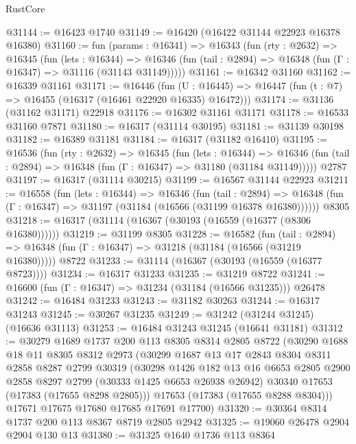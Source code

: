 \begin{lexlean}{RustCore}
\begin{coremodule}
@31144 := @16423 @1740
@31149 := @16420 (@16422 @31144 @22923 @16378 @16380)
@31160 := fun (params : @16341) =>
  @16343
    (fun (rty : @2632) =>
    @16345
      (fun (lets : @16344) =>
      @16346 (fun (tail : @2894) => @16348 (fun (Γ : @16347) => @31116 (@31143 @31149)))))
@31161 := @16342 @31160
@31162 := @16339 @31161
@31171 := @16446
    (fun (U : @16445) => @16447 (fun (t : @7) => @16455 (@16317 (@16461 @22920 @16335) @16472)))
@31174 := @31136 (@31162 @31171) @22918
@31176 := @16302 @31161 @31171
@31178 := @16533 @31160 @7871
@31180 := @16317 (@31114 @30195)
@31181 := @31139 @30198
@31182 := @16389 @31181
@31184 := @16317 (@31182 @16410)
@31195 := @16536
    (fun (rty : @2632) =>
    @16345
      (fun (lets : @16344) =>
      @16346 (fun (tail : @2894) => @16348 (fun (Γ : @16347) => @31180 (@31184 @31149)))))
    @2787
@31197 := @16317 (@31114 @30215)
@31199 := @16567 @31144 @22923
@31211 := @16558
    (fun (lets : @16344) =>
    @16346
      (fun (tail : @2894) =>
      @16348 (fun (Γ : @16347) => @31197 (@31184 (@16566 (@31199 @16378 @16380))))))
    @8305
@31218 := @16317 (@31114 (@16367 (@30193 (@16559 (@16377 (@8306 @16380))))))
@31219 := @31199 @8305
@31228 := @16582
    (fun (tail : @2894) => @16348 (fun (Γ : @16347) => @31218 (@31184 (@16566 (@31219 @16380)))))
    @8722
@31233 := @31114 (@16367 (@30193 (@16559 (@16377 @8723))))
@31234 := @16317 @31233
@31235 := @31219 @8722
@31241 := @16600 (fun (Γ : @16347) => @31234 (@31184 (@16566 @31235))) @26478
@31242 := @16484 @31233
@31243 := @31182 @30263
@31244 := @16317 @31243
@31245 := @30267 @31235
@31249 := @31242 (@31244 @31245) (@16636 @31113)
@31253 := @16484 @31243 @31245 (@16641 @31181)
@31312 := @30279
    @1689
    @1737
    @200
    @113
    @8305
    @8314
    @2805
    @8722
    (@30290
      @1688
      @18
      @11
      @8305
      @8312
      @2973
      (@30299
        @1687
        @13
        @17
        @2843
        @8304
        @8311
        @2858
        @8287
        @2799
        @30319
        (@30298
          @1426
          @182
          @13
          @16
          @6653
          @2805
          @2900
          @2858
          @8297
          @2799
          (@30333 @1425 @6653 @26938 @26942)
          @30340
          @17653
          (@17383 (@17655 @8298 @2805)))
        @17653
        (@17383 (@17655 @8288 @8304)))
      @17671
      @17675
      @17680
      @17685
      @17691
      @17700)
@31320 := @30364 @8314 @1737 @200 @113 @8367 @8719 @2805 @2942
@31325 := @19060 @26478 @2904 @2904 @130 @13
@31380 := @31325
    @1640
    @1736
    @113
    @8364

\end{coremodule}
\end{lexlean}
